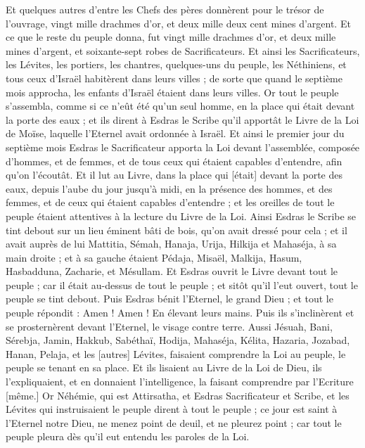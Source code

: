 \begin{multicols}{2}
{Et quelques autres d'entre les Chefs des pères donnèrent pour le trésor de l'ouvrage, vingt mille drachmes d'or, et deux mille deux cent mines d'argent.
Et ce que le reste du peuple donna, fut vingt mille drachmes d'or, et deux mille mines d'argent, et soixante-sept robes de Sacrificateurs.
Et ainsi les Sacrificateurs, les Lévites, les portiers, les chantres, quelques-uns du peuple, les Néthiniens, et tous ceux d'Israël habitèrent dans leurs villes ; de sorte que quand le septième mois approcha, les enfants d'Israël étaient dans leurs villes.
\VerseOne{}Or tout le peuple s'assembla, comme si ce n'eût été qu'un seul homme, en la place qui était devant la porte des eaux ; et ils dirent à Esdras le Scribe qu'il apportât le Livre de la Loi de Moïse, laquelle l'Eternel avait ordonnée à Israël.
Et ainsi le premier jour du septième mois Esdras le Sacrificateur apporta la Loi devant l'assemblée, composée d'hommes, et de femmes, et de tous ceux qui étaient capables d'entendre, afin qu'on l'écoutât.
Et il lut au Livre, dans la place qui [était] devant la porte des eaux, depuis l'aube du jour jusqu'à midi, en la présence des hommes, et des femmes, et de ceux qui étaient capables d'entendre ; et les oreilles de tout le peuple étaient attentives à la lecture du Livre de la Loi.
Ainsi Esdras le Scribe se tint debout sur un lieu éminent bâti de bois, qu'on avait dressé pour cela ; et il avait auprès de lui Mattitia, Sémah, Hanaja, Urija, Hilkija et Mahaséja, à sa main droite ; et à sa gauche étaient Pédaja, Misaël, Malkija, Hasum, Hasbadduna, Zacharie, et Mésullam.
Et Esdras ouvrit le Livre devant tout le peuple ; car il était au-dessus de tout le peuple ; et sitôt qu'il l'eut ouvert, tout le peuple se tint debout.
Puis Esdras bénit l'Eternel, le grand Dieu ; et tout le peuple répondit : Amen ! Amen ! En élevant leurs mains. Puis ils s'inclinèrent et se prosternèrent devant l'Eternel, le visage contre terre.
Aussi Jésuah, Bani, Sérebja, Jamin, Hakkub, Sabéthaï, Hodija, Mahaséja, Kélita, Hazaria, Jozabad, Hanan, Pelaja, et les [autres] Lévites, faisaient comprendre la Loi au peuple, le peuple se tenant en sa place.
Et ils lisaient au Livre de la Loi de Dieu, ils l'expliquaient, et en donnaient l'intelligence, la faisant comprendre par l'Ecriture [même.]
Or Néhémie, qui est Attirsatha, et Esdras Sacrificateur et Scribe, et les Lévites qui instruisaient le peuple dirent à tout le peuple ; ce jour est saint à l'Eternel notre Dieu, ne menez point de deuil, et ne pleurez point ; car tout le peuple pleura dès qu'il eut entendu les paroles de la Loi.
}
\end{multicols}
